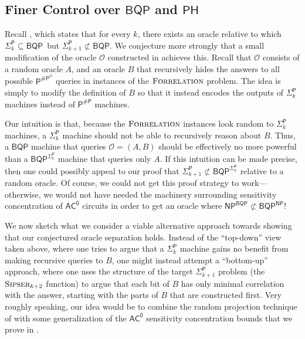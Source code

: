 \documentclass[11pt]{article}%
\newcommand{\Sipser}{\normalfont\textsc{Sipser}}
\newcommand{\Forrelation}{\normalfont\textsc{Forrelation}}
\begin{document}
\subsection{Finer Control over \texorpdfstring{$\mathsf{BQP}$}{BQP} and \texorpdfstring{$\mathsf{PH}$}{PH}}
Recall , which states that for every $k$, there exists an oracle relative to which $\mathsf{\Sigma}_{k}^{\mathsf{P}}\subseteq\mathsf{BQP}$\ but $\mathsf{\Sigma}_{k+1}^{\mathsf{P}}\not \subset \mathsf{BQP}$. We conjecture more strongly that a small modification of the oracle $\mathcal{O}$ constructed in  achieves this. Recall that $\mathcal{O}$ consists of a random oracle $A$, and an oracle $B$ that recursively hides the answers to all possible $\mathsf{P}^{\mathsf{\# P}^\mathcal{O}}$ queries in instances of the $\Forrelation$ problem. The idea is simply to modify the definition of $B$ so that it instead encodes the outputs of $\mathsf{\Sigma}_{k}^{\mathsf{P}}$ machines instead of $\mathsf{P}^{\mathsf{\# P}}$ machines.

Our intuition is that, because the $\Forrelation$ instances look random to $\mathsf{\Sigma}_{k}^{\mathsf{P}}$ machines, a $\mathsf{\Sigma}_{k}^{\mathsf{P}}$ machine should not be able to recursively reason about $B$. Thus, a $\mathsf{BQP}$ machine that queries $\mathcal{O} = (A, B)$ should be effectively no more powerful than a $\mathsf{BQP}^{\mathsf{\Sigma}_{k}^{\mathsf{P}}}$ machine that queries only $A$. If this intuition can be made precise, then one could possibly appeal to our proof that $\mathsf{\Sigma}_{k+1}^{\mathsf{P}}\not \subset \mathsf{BQP}^{\mathsf{\Sigma}_{k}^\mathsf{P}}$ relative to a random oracle. Of course, we could not get this proof strategy to work---otherwise, we would not have needed the machinery surrounding sensitivity concentration of $\mathsf{AC^0}$ circuits in order to get an oracle where $\mathsf{NP}^\mathsf{BQP} \not\subset \mathsf{BQP}^\mathsf{NP}$!

We now sketch what we consider a viable alternative approach towards showing that our conjectured oracle separation holds. Instead of the ``top-down'' view taken above, where one tries to argue that a $\mathsf{\Sigma}_{k}^{\mathsf{P}}$ machine gains no benefit from making recursive queries to $B$, one might instead attempt a ``bottom-up'' approach, where one uses the structure of the target $\mathsf{\Sigma}_{k+1}^\mathsf{P}$ problem (the $\Sipser_{k+2}$ function) to argue that each bit of $B$ has only minimal correlation with the answer, starting with the parts of $B$ that are constructed first. Very roughly speaking, our idea would be to combine the random projection technique of \cite{HRST17} with some generalization of the $\mathsf{AC^0}$ sensitivity concentration bounds that we prove in .
\end{document}
